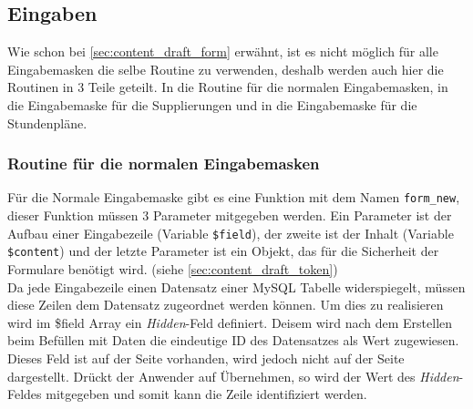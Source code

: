 \subsection{Eingaben}
%
%
%
% 
%
Wie schon bei \autoref{sec:content_draft_form} erwähnt, ist es nicht möglich für alle Eingabemasken die selbe Routine zu verwenden, deshalb werden auch hier die Routinen in 3 Teile geteilt. In die Routine für die normalen Eingabemasken, in die Eingabemaske für die Supplierungen und in die Eingabemaske für die Stundenpläne.
\subsubsection{Routine für die normalen Eingabemasken}
Für die Normale Eingabemaske gibt es eine Funktion mit dem Namen \texttt{form\_new}, dieser Funktion müssen 3 Parameter mitgegeben werden. Ein Parameter ist der Aufbau einer Eingabezeile (Variable \texttt{\$field}), der zweite ist der Inhalt (Variable \texttt{\$content}) und der letzte Parameter ist ein Objekt, das für die Sicherheit der Formulare benötigt wird. (siehe \autoref{sec:content_draft_token})\\
Da jede Eingabezeile einen Datensatz einer MySQL Tabelle widerspiegelt,
müssen diese Zeilen dem Datensatz zugeordnet werden können. Um dies zu realisieren wird im \$field Array ein \textit{Hidden}-Feld definiert. Deisem wird nach dem Erstellen beim Befüllen mit Daten die eindeutige ID des Datensatzes als Wert zugewiesen. Dieses Feld ist auf der Seite vorhanden, wird jedoch nicht auf der Seite dargestellt. Drückt der Anwender auf Übernehmen, so wird der Wert des \textit{Hidden}-Feldes mitgegeben und somit kann die Zeile identifiziert werden.\\
